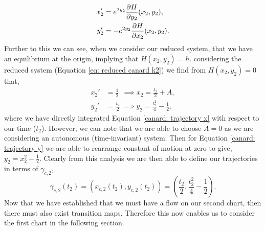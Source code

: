 \begin{align*}
x'_2&=e^{2y_2}\pd{H}{y_2}(x_2,y_2),\\
y_2'&=-e^{2y_2}\pd{H}{x_2}(x_2,y_2).
\end{align*}
Further to this we can see, when we consider our reduced system, that we have an equilibrium at the origin, implying that $H(x_2,y_2)=h$.
considering the reduced system (Equation \ref{eq: reduced canard k2}) we find from $ H(x_2,y_2)=0 $ that,
\begin{subequations}
	\begin{align}
	x_2'&=\frac{1}{2}\ \	\implies x_2=\frac{t_2}{2}+A, \label{canard: trajectory x}\\
	y_2'&=\frac{t_2}{2}\ \implies y_2=\frac{t_2^2}{4}-\frac{1}{2}, \label{canard: trajectory y}
	\end{align}
\end{subequations} 
where we have directly integrated Equation \ref{canard: trajectory x} with respect to our time ($ t_2 $). However, we can note that we are able to choose $ A=0 $ as we are considering an autonomous (time-invariant) system. Then for Equation \ref{canard: trajectory y} we are able to rearrange constant of motion at zero to give, $ y_2=x_2^2-\frac{1}{2} $. Clearly from this analysis we are then able to define our trajectories in terms of $ \gamma_{c,2} $, 
\begin{equation}
\gamma_{c,2}(t_2)=(x_{c,2}(t_2),y_{c,2}(t_2))=\left(\frac{t_2}{2},\frac{t^2_2}{4}-\frac{1}{2}\right).   
\end{equation}
Now that we have established that we must have a flow on our second chart, then there must also exist transition maps. Therefore this now enables us to consider the first chart in the following section.


